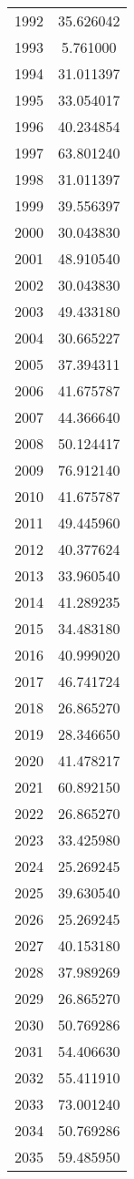 \documentclass[12pt]{article}
\begin{document}
\begin{longtable}{@{}cc@{}}
1992 & 35.626042 \\
1993 & 5.761000 \\
1994 & 31.011397 \\
1995 & 33.054017 \\
1996 & 40.234854 \\
1997 & 63.801240 \\
1998 & 31.011397 \\
1999 & 39.556397 \\
2000 & 30.043830 \\
2001 & 48.910540 \\
2002 & 30.043830 \\
2003 & 49.433180 \\
2004 & 30.665227 \\
2005 & 37.394311 \\
2006 & 41.675787 \\
2007 & 44.366640 \\
2008 & 50.124417 \\
2009 & 76.912140 \\
2010 & 41.675787 \\
2011 & 49.445960 \\
2012 & 40.377624 \\
2013 & 33.960540 \\
2014 & 41.289235 \\
2015 & 34.483180 \\
2016 & 40.999020 \\
2017 & 46.741724 \\
2018 & 26.865270 \\
2019 & 28.346650 \\
2020 & 41.478217 \\
2021 & 60.892150 \\
2022 & 26.865270 \\
2023 & 33.425980 \\
2024 & 25.269245 \\
2025 & 39.630540 \\
2026 & 25.269245 \\
2027 & 40.153180 \\
2028 & 37.989269 \\
2029 & 26.865270 \\
2030 & 50.769286 \\
2031 & 54.406630 \\
2032 & 55.411910 \\
2033 & 73.001240 \\
2034 & 50.769286 \\
2035 & 59.485950 \\

\end{longtable}
\end{document}
